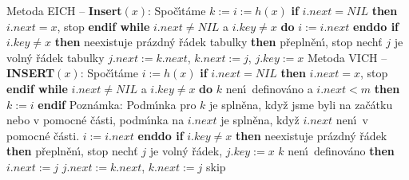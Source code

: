 \flushpar Metoda EICH -- {\bf Insert$\left(x\right)$}:\newline 
Spo\v c\'\i t\'ame $k:=i:=h\left(x\right)$\newline 
{\bf if} $i.next=NIL$ {\bf then} $i.next=x$, stop {\bf endif\newline 
while} $i.next\ne NIL$ a $i.key\ne x$ {\bf do} $i:=i.next$ {\bf enddo\newline 
if} $i.key\ne x$ {\bf then}\newline 
\phantom{---}{\bf if} neexistuje pr\'azdn\'y \v r\'adek tabulky {\bf then}\newline 
\phantom{------}p\v repln\v en\'\i, stop\newline 
\phantom{---}{\bf else}\newline 
\phantom{------}nech\v t $j$ je voln\'y \v r\'adek tabulky\newline 
\phantom{------}$j.next:=k.next$, $k.next:=j$, $j.key:=x$\newline 
\phantom{---}{\bf endif\newline 
endif
\medskip

}\flushpar Metoda VICH -- {\bf INSERT$\left(x\right)$}:\newline 
Spo\v c\'\i t\'ame $i:=h\left(x\right)$\newline 
{\bf if} $i.next=NIL$ {\bf then} $i.next=x$, stop {\bf endif\newline 
while} $i.next\ne NIL$ a $i.key\ne x$ {\bf do}\newline 
\phantom{---}{\bf if} $k$ nen\'\i\ definov\'ano a $i.next<m$ {\bf then} $
k:=i$ {\bf endif\newline }
Pozn\'amka: Podm\'\i nka pro $k$ je spln\v ena, kdy\v z jsme byli na 
za\v c\'atku nebo v pomocn\'e \v c\'asti, podm\'\i nka na $i.next$ je spln\v ena, 
kdy\v z $i.next$ nen\'\i\ v pomocn\'e \v c\'asti.\newline 
\phantom{---}$i:=i.next$\newline 
{\bf enddo\newline 
if} $i.key\ne x$ {\bf then}\newline 
\phantom{---}{\bf if} neexistuje pr\'azdn\'y \v r\'adek {\bf then}\newline 
\phantom{------}p\v repln\v en\'\i, stop\newline 
\phantom{---}{\bf else}\newline 
\phantom{------}nech\v t $j$ je voln\'y \v r\'adek, $j.key
:=x$\newline 
\phantom{------}{\bf if} $k$ nen\'\i\ definov\'ano {\bf then}\newline 
\phantom{---------}$i.next:=j$\newline 
\phantom{------}{\bf else}\newline 
\phantom{---------}$j.next:=k.next$, $k.next:=j$\newline 
\phantom{------}{\bf endif}\newline 
\phantom{---}{\bf endif\newline 
endif}
skip

